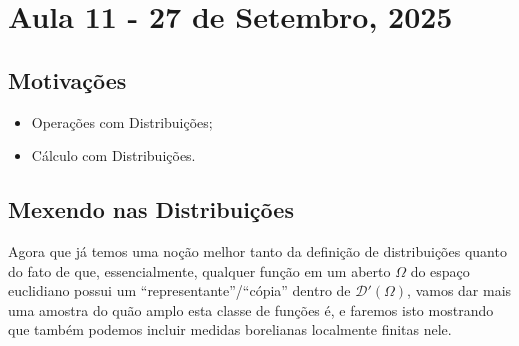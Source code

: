 \documentclass[../distribution_theory_notes.tex]{subfiles}
\begin{document}
\section{Aula 11 - 27 de Setembro, 2025}
\subsection{Motivações}
\begin{itemize}
	\item Operações com Distribuições;
	\item Cálculo com Distribuições.
\end{itemize}
\subsection{Mexendo nas Distribuições}

Agora que já temos uma noção melhor tanto da definição de distribuições quanto do fato de que, essencialmente, qualquer função em um aberto \(\Omega \) do espaço euclidiano possui um ``representante''/``cópia'' dentro de \(\mathcal{D}'(\Omega )\), vamos dar mais uma amostra do quão amplo esta classe de funções é, e faremos isto mostrando que também podemos incluir medidas borelianas localmente finitas nele.
\end{document}
